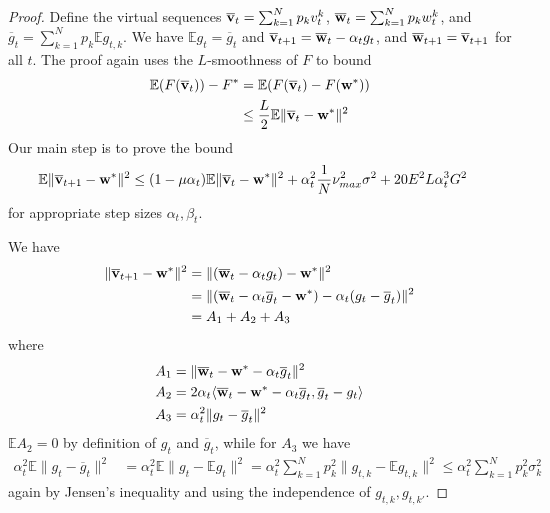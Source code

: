 \begin{proof}
Define the virtual sequences ${\overline{\mathbf{v}}}_{t}=\sum_{k=1}^{N}p_{k}v_{t}^{k}$,
${\overline{\mathbf{w}}}_{t}=\sum_{k=1}^{N}p_{k}w_{t}^{k}$, and $\overline{g}_{t}=\sum_{k=1}^{N}p_{k}\mathbb{E}g_{t,k}$.
We have $\mathbb{E}g_{t}=\overline{g}_{t}$ and ${\overline{\mathbf{v}}}_{t+1}={\overline{\mathbf{w}}}_{t}-\alpha_{t}g_{t}$,
and ${\overline{\mathbf{w}}}_{t+1}={\overline{\mathbf{v}}}_{t+1}$ for all $t$. The proof
again uses the $L$-smoothness of $F$ to bound 
\begin{align*}
\mathbb{E}(F({\overline{\mathbf{v}}}_{t}))-F^{\ast} & =\mathbb{E}(F({\overline{\mathbf{v}}}_{t})-F({\mathbf{w}}^{\ast}))\\
& \leq\frac{L}{2}\mathbb{E}\|{\overline{\mathbf{v}}}_{t}-{\mathbf{w}}^{\ast}\|^{2}
\end{align*}
Our main step is to prove the bound
\begin{align*}
\mathbb{E}\|{\overline{\mathbf{v}}}_{t+1}-{\mathbf{w}}^{\ast}\|^{2} & \leq(1-\mu\alpha_{t})\mathbb{E}\|{\overline{\mathbf{v}}}_{t}-{\mathbf{w}}^{\ast}\|^{2}+\alpha_{t}^{2}\frac{1}{N}\nu_{max}^{2}\sigma^{2}+20E^{2}L\alpha_{t}^{3}G^{2}
\end{align*}
 for appropriate step sizes $\alpha_{t},\beta_{t}$.

We have 
\begin{align*}
\|{\overline{\mathbf{v}}}_{t+1}-{\mathbf{w}}^{\ast}\|^{2} & =\|({\overline{\mathbf{w}}}_{t}-\alpha_{t}g_{t})-{\mathbf{w}}^{\ast}\|^{2}\\
& =\|({\overline{\mathbf{w}}}_{t}-\alpha_{t}\overline{g}_{t}-{\mathbf{w}}^{\ast})-\alpha_{t}(g_{t}-\overline{g}_{t})\|^{2}\\
& =A_{1}+A_{2}+A_{3}
\end{align*}
where 
\begin{align*}
A_{1} & =\|{\overline{\mathbf{w}}}_{t}-{\mathbf{w}}^{\ast}-\alpha_{t}\overline{g}_{t}\|^{2}\\
A_{2} & =2\alpha_{t}\langle{\overline{\mathbf{w}}}_{t}-{\mathbf{w}}^{\ast}-\alpha_{t}\overline{g}_{t},\overline{g}_{t}-g_{t}\rangle\\
A_{3} & =\alpha_{t}^{2}\|g_{t}-\overline{g}_{t}\|^{2}
\end{align*}
$\mathbb{E}A_{2}=0$ by definition of $g_{t}$ and $\overline{g}_{t}$,
while for $A_{3}$ we have
\begin{align*}
\alpha_{t}^{2}\mathbb{E}\|g_{t}-\overline{g}_{t}\|^{2} & =\alpha_{t}^{2}\mathbb{E}\|g_{t}-\mathbb{E}g_{t}\|^{2}=\alpha_{t}^{2}\sum_{k=1}^{N}p_{k}^{2}\|g_{t,k}-\mathbb{E}g_{t,k}\|^{2}\leq\alpha_{t}^{2}\sum_{k=1}^{N}p_{k}^{2}\sigma_{k}^{2}
\end{align*}
again by Jensen's inequality and using the independence of $g_{t,k},g_{t,k'}$. 


\end{proof}
